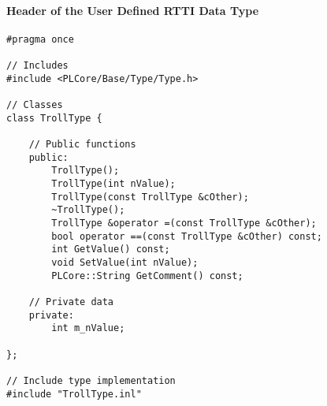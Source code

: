 \paragraph{Header of the User Defined \ac{RTTI} Data Type}
\begin{lstlisting}[label=Code:UserDefinedRTTIDataTypeHeader,caption={Header of the user defined \ac{RTTI} data type}]
#pragma once

// Includes
#include <PLCore/Base/Type/Type.h>

// Classes
class TrollType {

	// Public functions
	public:
		TrollType();
		TrollType(int nValue);
		TrollType(const TrollType &cOther);
		~TrollType();
		TrollType &operator =(const TrollType &cOther);
		bool operator ==(const TrollType &cOther) const;
		int GetValue() const;
		void SetValue(int nValue);
		PLCore::String GetComment() const;

	// Private data
	private:
		int m_nValue;

};

// Include type implementation
#include "TrollType.inl"
\end{lstlisting}


